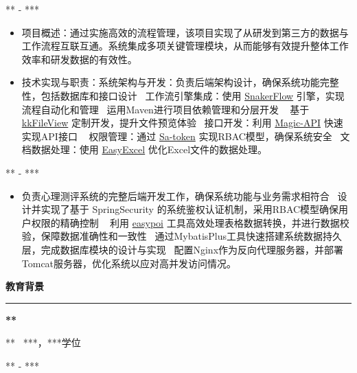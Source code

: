 \documentclass[11pt,a4paper]{article}
\renewcommand{\section}[1]{%
    \vspace{0.6em}%
    {\sffamily\Large\bfseries\color{sectioncolor}#1}%
    \vspace{0.2em}%
    \hrule height 0.5pt
    \vspace{0.4em}%
}
\newcommand{\company}[1]{%
    {\vspace{0.2em}\sffamily\textbf{\large#1}}%
}
\newcommand{\position}[2]{%
    \vspace{0.1em}  %
    \role{#1}\hfill\role{#2}%
    \vspace{0.2em}  %
}
\newcommand{\role}[1]{{\sffamily\color{graytext}\small#1}}
\newcommand{\daterange}[1]{\hfill{\sffamily\color{graytext}\small#1}}
\newcommand{\project}[1]{{\sffamily\textbf{\cjkit { \textit {\itshape#1}}}}}
\newcommand{\separator}{\textbullet~}  %
\begin{document}
\project{XXX系统}
\daterange{*** - ***}
\begin{itemize}
    \item 项目概述：通过实施高效的流程管理，该项目实现了从研发到第三方的数据与工作流程互联互通。系统集成多项关键管理模块，从而能够有效提升整体工作效率和研发数据的有效性。
    \item 技术实现与职责：系统架构与开发：负责后端架构设计，确保系统功能完整性，包括数据库和接口设计 \separator 工作流引擎集成：使用  \href{https://github.com/snakerflow-starter/snakerflow-spring-boot-starter}{SnakerFlow} 引擎，实现流程自动化和管理 \separator 运用Maven进行项目依赖管理和分层开发 \separator
        基于\href{https://kkview.cn/zh-cn/index.html}{kkFileView} 定制开发，提升文件预览体验 \separator 接口开发：利用 \href{https://www.ssssssss.org/magic-api/}{Magic-API} 快速实现API接口 \separator
        权限管理：通过 \href{https://sa-token.cc/}{Sa-token} 实现RBAC模型，确保系统安全 \separator 文档数据处理：使用 \href{https://easyexcel.opensource.alibaba.com/}{EasyExcel} 优化Excel文件的数据处理。

\end{itemize}
   


\project{XXX系统}
\daterange{*** - ***}
\begin{itemize}
    \sloppy
    \item 负责心理测评系统的完整后端开发工作，确保系统功能与业务需求相符合 \separator 设计并实现了基于 SpringSecurity 的系统鉴权认证机制，采用RBAC模型确保用户权限的精确控制 \separator
    利用 \href{https://gitee.com/wupaas/easypoi}{easypoi} 工具高效处理表格数据转换，并进行数据校验，保障数据准确性和一致性 \separator 通过MybatisPlus工具快速搭建系统数据持久层，完成数据库模块的设计与实现 \separator 配置Nginx作为反向代理服务器，并部署Tomcat服务器，优化系统以应对高并发访问情况。
\end{itemize}

\section{教育背景}
\company{***} 
\position{*** \separator ***，***学位}{}
\daterange{*** - ***}
\end{document}

